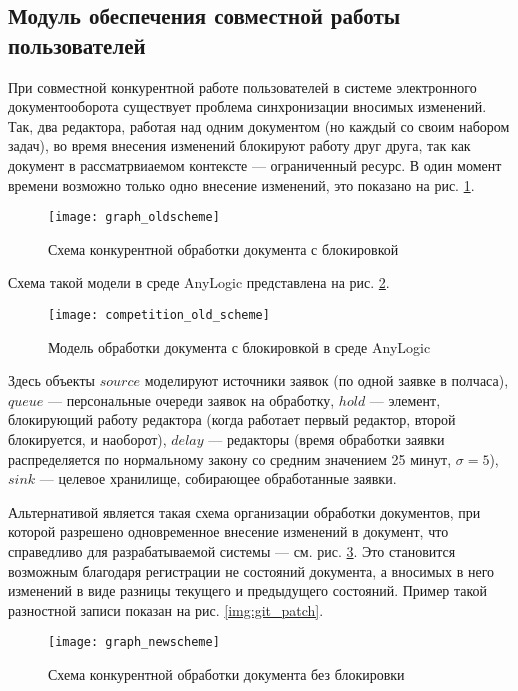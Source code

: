 \subsection{Модуль обеспечения совместной работы пользователей} \label{research_competition}

При совместной конкурентной работе пользователей в системе электронного документооборота существует проблема синхронизации вносимых изменений. Так, два редактора, работая над одним документом (но каждый со своим набором задач), во время внесения изменений блокируют работу друг друга, так как документ в рассматрвиаемом контексте --- ограниченный ресурс. В один момент времени возможно только одно внесение изменений, это показано на рис. \ref{img:graph_oldscheme}.
\begin{figure}[h!]
  \centering
  \texttt{[image: graph\_oldscheme]}
  \caption{Схема конкурентной обработки документа с блокировкой}
  \label{img:graph_oldscheme}
\end{figure}

\vspace{\baselineskip}
Схема такой модели в среде AnyLogic представлена на рис. \ref{img:competition_old_scheme}.
\begin{figure}[h!]
  \centering
  \texttt{[image: competition\_old\_scheme]}
  \caption{Модель обработки документа с блокировкой в среде AnyLogic}
  \label{img:competition_old_scheme}
\end{figure}

Здесь объекты $source$ моделируют источники заявок (по одной заявке в полчаса), $queue$ --- персональные очереди заявок на обработку, $hold$ --- элемент, блокирующий работу редактора (когда работает первый редактор, второй блокируется, и наоборот), $delay$ --- редакторы (время обработки заявки распределяется по нормальному закону со средним значением 25 минут, $\sigma=5$), $sink$ --- целевое хранилище, собирающее обработанные заявки.

\vspace{\baselineskip}
Альтернативой является такая схема организации обработки документов, при которой разрешено одновременное внесение изменений в документ, что справедливо для разрабатываемой системы --- см. рис. \ref{img:graph_newscheme}. Это становится возможным благодаря регистрации не состояний документа, а вносимых в него изменений в виде разницы текущего и предыдущего состояний. Пример такой разностной записи показан на рис. \ref{img:git_patch}.

\begin{figure}[h!]
  \centering
  \texttt{[image: graph\_newscheme]}
  \caption{Схема конкурентной обработки документа без блокировки}
  \label{img:graph_newscheme}
\end{figure}

